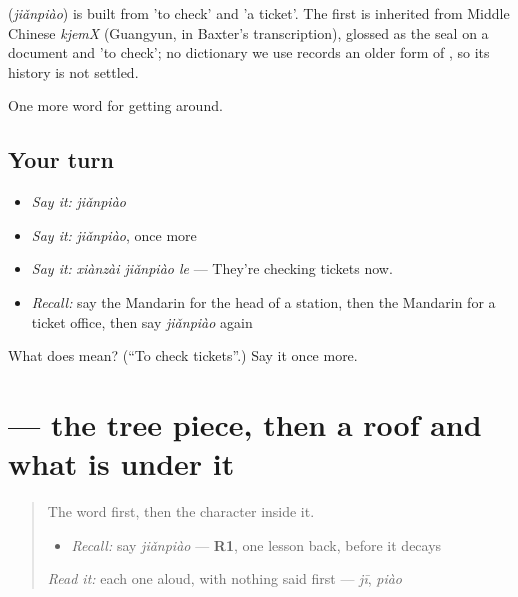 \begin{cousinweb}
\textbf{} (\emph{jiǎnpiào}) is built from  'to check' and  'a ticket'. The first is inherited from Middle Chinese \emph{kjemX} (Guangyun, in Baxter's transcription), glossed as the seal on a document and 'to check'; no dictionary we use records an older form of , so its history is not settled.
\end{cousinweb}

\begin{grammarlens}[title={What you've built}]
One more word for getting around.
\end{grammarlens}

\subsection*{Your turn}
\begin{itemize}
\raggedright
  \item \emph{Say it:} \emph{jiǎnpiào}
  \item \emph{Say it:} \emph{jiǎnpiào}, once more
  \item \emph{Say it:} \emph{xiànzài jiǎnpiào le} — They're checking tickets now.
  \item \emph{Recall:} say the Mandarin for the head of a station, then the Mandarin for a ticket office, then say \emph{jiǎnpiào} again
\end{itemize}

\begin{tcolorbox}[breakable,colback=teal!4,colframe=teal!35!black,title={Before you move on}]
What does  mean? (\textquotedblleft{}To check tickets\textquotedblright{}.) Say it once more.
\end{tcolorbox}
\section[\texorpdfstring{\zh{检} (jiǎn)}{检 (jiǎn)}]{ — the tree piece, then a roof and what is under it}

\label{lesson:ZH-W404-jian-check}



\begin{quote}
The word first, then the character inside it.

\begin{itemize}
\raggedright
  \item \emph{Recall:} say \emph{jiǎnpiào} — \textbf{R1}, one lesson back, before it decays
\end{itemize}

\begin{quote}
 
\end{quote}

\emph{Read it:} each one aloud, with nothing said first — \emph{jī}, \emph{piào}
\end{quote}

